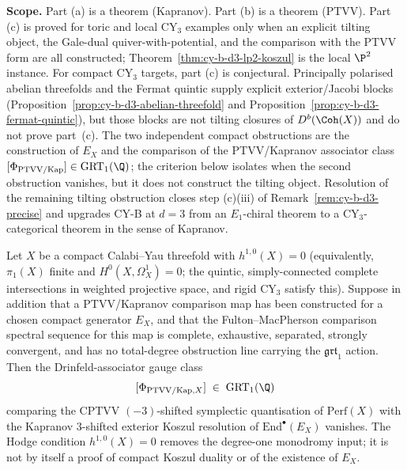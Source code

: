 \begin{conjecture}
\begin{enumerate}[label=\textup{(\alph*)}]
\end{enumerate}
\textbf{Scope.} Part (a) is a theorem (Kapranov). Part (b) is a theorem
(PTVV). Part (c) is proved for toric and local CY$_3$ examples only when
an explicit tilting object, the Gale-dual quiver-with-potential, and the
comparison with the PTVV form are all constructed; Theorem~\ref{thm:cy-b-d3-lp2-koszul}
is the local $\P^2$ instance. For compact CY$_3$ targets, part (c) is
conjectural. Principally polarised abelian threefolds and the Fermat
quintic supply explicit exterior/Jacobi blocks
\textup{(}Proposition~\ref{prop:cy-b-d3-abelian-threefold} and
Proposition~\ref{prop:cy-b-d3-fermat-quintic}\textup{)}, but those blocks
are not tilting closures of $D^b(\Coh(X))$ and do not prove part~(c).
The two independent compact obstructions are the construction of $E_X$
and the comparison of the PTVV/Kapranov associator class
$[\Phi_{\mathrm{PTVV}/\mathrm{Kap}}] \in \mathrm{GRT}_1(\Q)$; the criterion
below isolates when the second obstruction vanishes, but it does not
construct the tilting object.
Resolution of the remaining tilting obstruction closes step (c)(iii) of
Remark~\ref{rem:cy-b-d3-precise} and upgrades CY-B at $d=3$ from
an $E_1$-chiral theorem to a CY$_3$-categorical theorem in the sense of
Kapranov.
\end{conjecture}

\begin{theorem}
\label{thm:cy-b-d3-grt-vanishing-simply-connected}
Let $X$ be a compact Calabi--Yau threefold with $h^{1,0}(X) = 0$
(equivalently, $\pi_1(X)$ finite and $H^0(X, \Omega_X^1) = 0$; the
quintic, simply-connected complete intersections in weighted
projective space, and rigid CY$_3$ satisfy this). Suppose in addition
that a PTVV/Kapranov comparison map has been constructed for a chosen
compact generator $E_X$, and that the Fulton--MacPherson comparison
spectral sequence for this map is complete, exhaustive, separated,
strongly convergent, and has no total-degree obstruction line carrying
the $\mathfrak{grt}_1$ action. Then the Drinfeld-associator gauge class
\[
[\Phi_{\mathrm{PTVV}/\mathrm{Kap}, X}] \;\in\; \mathrm{GRT}_1(\Q)
\]
comparing the CPTVV $(-3)$-shifted symplectic quantisation of
$\mathrm{Perf}(X)$ with the Kapranov $3$-shifted exterior Koszul
resolution of $\mathrm{End}^\bullet(E_X)$ vanishes. The Hodge condition
$h^{1,0}(X)=0$ removes the degree-one monodromy input; it is not by
itself a proof of compact Koszul duality or of the existence of $E_X$.
\end{theorem}

